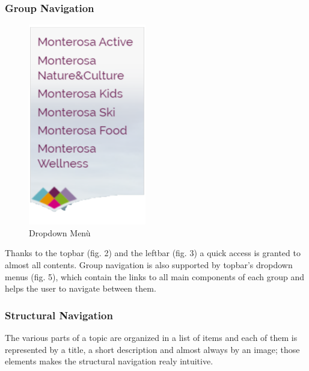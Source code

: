 \subsubsection{Group Navigation}
\begin{figure}
    	\includegraphics[width=0.9\linewidth]{./assets/dropdown-menu.png}
	\caption{Dropdown Menù}
\end{figure} Thanks to the topbar (fig. 2) and the leftbar (fig. 3) a quick access is granted to almost all contents. Group navigation is also supported by topbar's dropdown menus (fig. 5), which contain the links to all main components of each group and helps the user to navigate between them. 

\subsubsection{Structural Navigation}
The various parts of a topic are organized in a list of items and each of them is represented by a title, a short description and almost always by an image; those elements makes the structural navigation realy intuitive.


